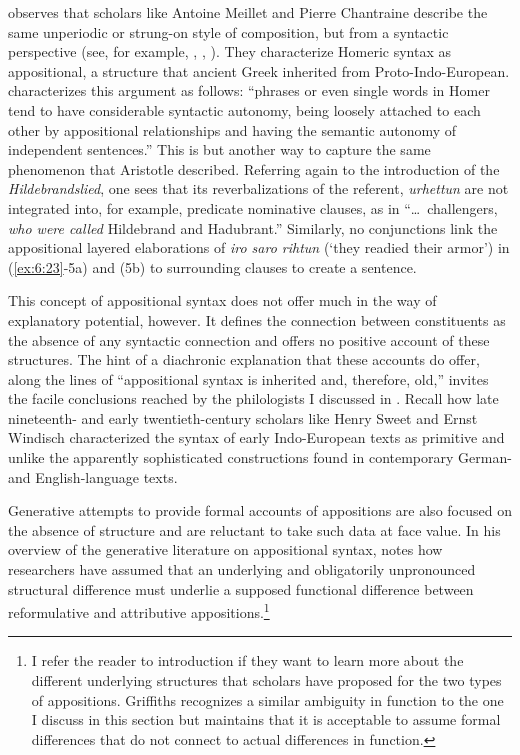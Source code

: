 \citet[40--42]{Bakker1997} observes that scholars like Antoine Meillet and Pierre Chantraine describe the same unperiodic or strung-on style of composition, but from a syntactic perspective (see, for example, \citealt[358--359]{Meillet1937}, \citealt[598--599]{MeilletVendryes1963}, \citealt[12]{Chantraine1953}). They characterize Homeric syntax as appositional, a structure that ancient Greek inherited from Proto-Indo-European. \citet[40]{Bakker1997} characterizes this argument as follows: “phrases or even single words in Homer tend to have considerable syntactic autonomy, being loosely attached to each other by appositional relationships and having the semantic autonomy of independent sentences.” This is but another way to capture the same phenomenon that Aristotle described. Referring again to the introduction of the \textit{Hildebrandslied}, one sees that its reverbalizations of the referent, \textit{urhettun} are not integrated into, for example, predicate nominative clauses, as in “…~challengers, \textit{who were called} Hildebrand and Hadubrant.” Similarly, no conjunctions link the appositional layered elaborations of \textit{iro saro rihtun} (`they readied their armor') in (\ref{ex:6:23}-5a) and (5b) to surrounding clauses to create a sentence.

This concept of appositional syntax does not offer much in the way of explanatory potential, however. It defines the connection between constituents as the absence of any syntactic connection and offers no positive account of these structures. The hint of a diachronic explanation that these accounts do offer, along the lines of “appositional syntax is inherited and, therefore, old,” invites the facile conclusions reached by the philologists I discussed in . Recall how late nineteenth- and early twentieth-century scholars like Henry Sweet and Ernst Windisch characterized the syntax of early Indo-European texts as primitive and unlike the apparently sophisticated constructions found in contemporary German- and English-language texts.

Generative attempts to provide formal accounts of appositions are also focused on the absence of structure and are reluctant to take such data at face value. In his overview of the generative literature on appositional syntax, \citet[1--6]{Griffiths2015} notes how researchers have assumed that an underlying and obligatorily unpronounced structural difference must underlie a supposed functional difference between reformulative and attributive appositions.\footnote{{I refer the reader to  introduction if they want to learn more about the different underlying structures that scholars have proposed for the two types of appositions. Griffiths recognizes a similar ambiguity in function to the one I discuss in this section but maintains that it is acceptable to assume formal differences that do not connect to actual differences in function.}}

